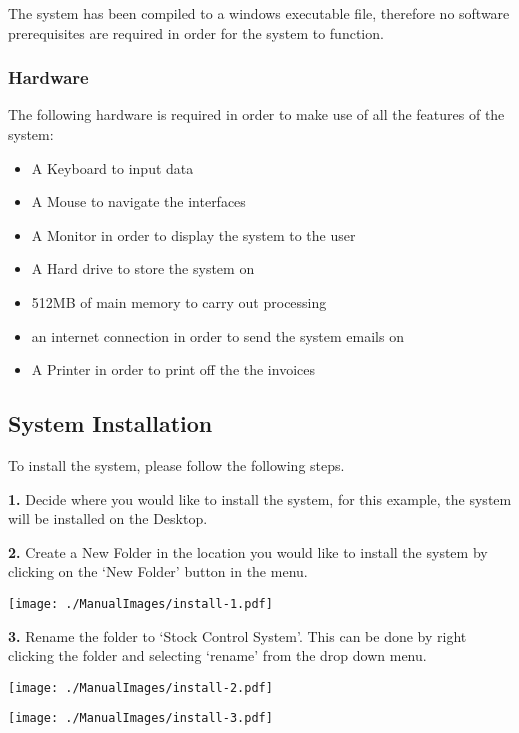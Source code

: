 The system has been compiled to a windows executable file, therefore no software prerequisites are required in order for the system to function.

\subsubsection{Hardware}

The following hardware is required in order to make use of all the features of the system:

\begin{itemize}
	\item{A Keyboard to input data}
	\item{A Mouse to navigate the interfaces}
	\item{A Monitor in order to display the system to the user}
	\item{A Hard drive to store the system on}
	\item{512MB of main memory to carry out processing}
	\item{an internet connection in order to send the system emails on}
	\item{A Printer in order to print off the the invoices}
\end{itemize}

\pagebreak

\subsection{System Installation}
\label{fig:System Installation}

To install the system, please follow the following steps.

\textbf{1.} Decide where you would like to install the system, for this example, the system will be installed on the Desktop.

\textbf{2.} Create a New Folder in the location you would like to install the system by clicking on the `New Folder' button in the menu.

\texttt{[image: ./ManualImages/install-1.pdf]}

\pagebreak

\textbf{3.} Rename the folder to `Stock Control System'. This can be done by right clicking the folder and selecting `rename' from the drop down menu.

\texttt{[image: ./ManualImages/install-2.pdf]}

\texttt{[image: ./ManualImages/install-3.pdf]}

